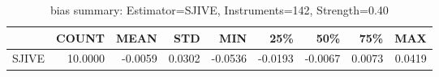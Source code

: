 \begin{table}[ht]
\centering
\caption{bias summary: Estimator=SJIVE, Instruments=142, Strength=0.40}
\begin{tabular}{lrrrrrrrr}
\toprule
 & COUNT & MEAN & STD & MIN & 25\% & 50\% & 75\% & MAX \\
\midrule
SJIVE & 10.0000 & -0.0059 & 0.0302 & -0.0536 & -0.0193 & -0.0067 & 0.0073 & 0.0419 \\
\bottomrule
\end{tabular}
\end{table}
